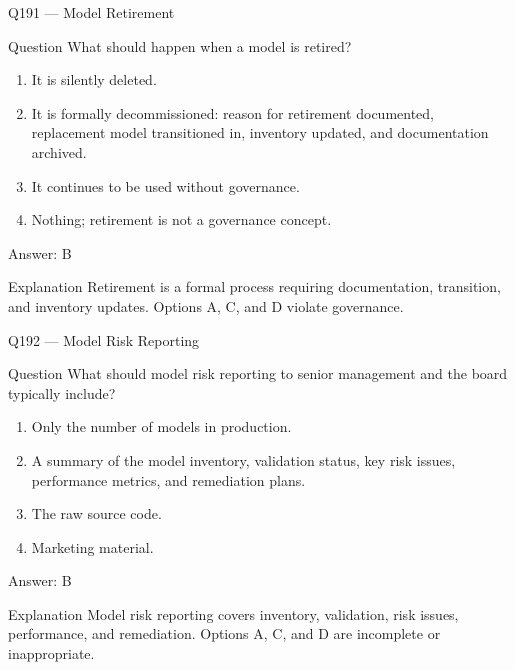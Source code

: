 \documentclass[aspectratio=169,8pt]{beamer}
\begin{document}
\begin{frame}{Q191 --- Model Retirement}
\begin{block}{Question}
	What should happen when a model is retired?
	\begin{enumerate}
		\item It is silently deleted.
		\item It is formally decommissioned: reason for retirement documented, replacement model transitioned in, inventory updated, and documentation archived.
		\item It continues to be used without governance.
		\item Nothing; retirement is not a governance concept.
	\end{enumerate}  \end{block}
	\begin{exampleblock}{Answer: B}\end{exampleblock}
	\begin{block}{Explanation}
		Retirement is a formal process requiring documentation, transition, and inventory updates. Options A, C, and D violate governance.
	\end{block}
\end{frame}

\begin{frame}{Q192 --- Model Risk Reporting}
	\begin{block}{Question}
		What should model risk reporting to senior management and the board typically include?
		\begin{enumerate}
			\item Only the number of models in production.
			\item A summary of the model inventory, validation status, key risk issues, performance metrics, and remediation plans.
			\item The raw source code.
			\item Marketing material.
		\end{enumerate}  \end{block}
		\begin{exampleblock}{Answer: B}\end{exampleblock}
		\begin{block}{Explanation}
			Model risk reporting covers inventory, validation, risk issues, performance, and remediation. Options A, C, and D are incomplete or inappropriate.
		\end{block}
	\end{frame}
	
\end{document}
